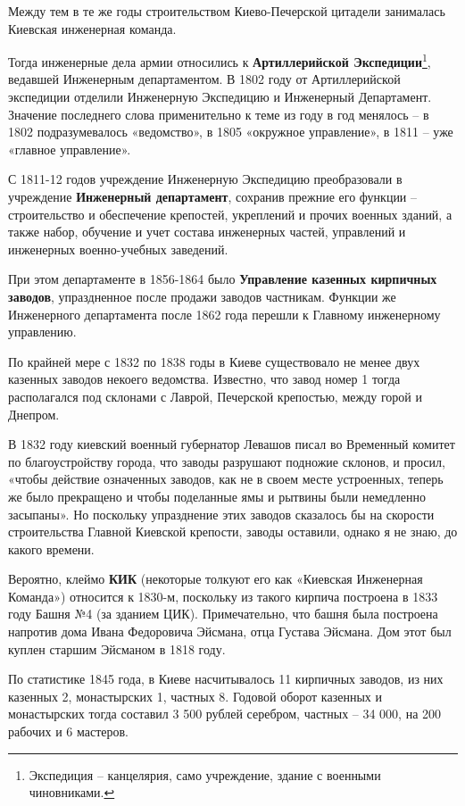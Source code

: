 Между тем в те же годы строительством Киево-Печер\-ской цитадели занималась Киевская инженерная команда.

Тогда инженерные дела армии относились к \textbf{Артиллерийской Экспедиции}\footnote{Экспедиция – канцелярия, само учреждение, здание с военными чиновниками.}, ведавшей Инженерным департаментом. В 1802 году от Артиллерийской экспедиции отделили Инженерную Экспедицию и Инженерный Департамент. Значение последнего слова применительно к теме из году в год менялось – в 1802 подразумевалось «ведомство», в 1805 «окружное управление», в 1811 – уже «главное управление».

С 1811-12 годов учреждение Инженерную Экспедицию преобразовали в учреждение \textbf{Инженерный департамент}, сохранив прежние его функции – строительство и обеспечение крепостей, укреплений и прочих военных зданий, а также набор, обучение и учет состава инженерных частей, управлений и инженерных военно-учебных заведений.

При этом департаменте в 1856-1864 было \textbf{Управление казенных кирпичных заводов}, упраздненное после продажи заводов частникам. Функции же Инженерного департамента после 1862 года перешли к Главному инженерному управлению.

По крайней мере с 1832 по 1838 годы в Киеве существовало не менее двух казенных заводов некоего ведомства. Известно, что завод номер 1 тогда располагался под склонами с Лаврой, Печерской крепостью, между горой и Днепром. 

В 1832 году киевский военный губернатор Левашов писал во Временный комитет по благоустройству города, что заводы разрушают подножие склонов, и просил, «чтобы действие означенных заводов, как не в своем месте устроенных, теперь же было прекращено и чтобы поделанные ямы и рытвины были немедленно засыпаны». Но поскольку упразднение этих заводов сказалось бы на скорости строительства Главной Киевской крепости, заводы оставили, однако я не знаю, до какого времени.

Вероятно, клеймо \textbf{КИК} (некоторые толкуют его как «Киевская Инженерная Команда») относится к 1830-м, поскольку из такого кирпича построена в 1833 году Башня №4 (за зданием ЦИК).  Примечательно, что башня была построена напротив дома Ивана Федоровича Эйсмана, отца Густава Эйсмана. Дом этот был куплен старшим Эйсманом в 1818 году.

По статистике 1845 года, в Киеве насчитывалось 11 кирпичных заводов, из них казенных 2, монастырских 1, частных 8. Годовой оборот казенных и монастырских тогда составил 3 500 рублей серебром, частных – 34 000, на 200 рабочих и 6 мастеров.


